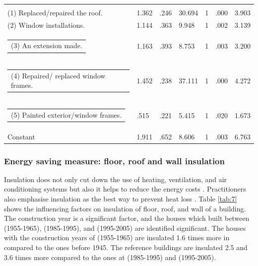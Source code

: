 \documentclass[preprint,12pt,3p]{elsarticle}
\begin{document}
\begin{footnotesize}
\begin{longtable}[c]{@{}lllllll@{}}
\begin{tabular}[c]{@{}l@{}}Relation with maintenance:\\ (1) Replaced/repaired the roof.\end{tabular}          & 1.362  & .246 & 30.694 & 1  & .000 & 3.903  \\
(2) Window installations.                                                                                & 1.144  & .363 & 9.948  & 1  & .002 & 3.139  \\
\begin{tabular}[c]{@{}l@{}}(3) An extension made.\end{tabular}                             & 1.163  & .393 & 8.753  & 1  & .003 & 3.200  \\
\begin{tabular}[c]{@{}l@{}}(4) Repaired/ replaced window frames.\end{tabular}                             & 1.452  & .238 & 37.111 & 1  & .000 & 4.272  \\
\begin{tabular}[c]{@{}l@{}}(5) Painted exterior/window frames.\end{tabular}  & .515   & .221 & 5.415  & 1  & .020 & 1.673  \\
Constant                                                                                                 & 1.911  & .652 & 8.606  & 1  & .003 & 6.763  \\* \bottomrule
\end{longtable}
\end{footnotesize}






\subsubsection{Energy saving measure: floor, roof and wall insulation}

Insulation does not only cut down the use of heating, ventilation, and air conditioning systems but also it helps to reduce the energy costs \citep{al2005}. Practitioners also emphasise insulation as the best way to prevent heat loss \citep{polreff19}. Table \ref{tab:7} shows the influencing factors on insulation of floor, roof, and wall of a building. The construction year is a significant factor, and the houses which built between (1955-1965), (1985-1995), and (1995-2005) are identified significant. The houses with the construction years of (1955-1965) are insulated 1.6 times more in compared to the ones before 1945. The reference buildings are insulated 2.5 and 3.6 times more compared to the ones at (1985-1995) and (1995-2005).
\end{document}
